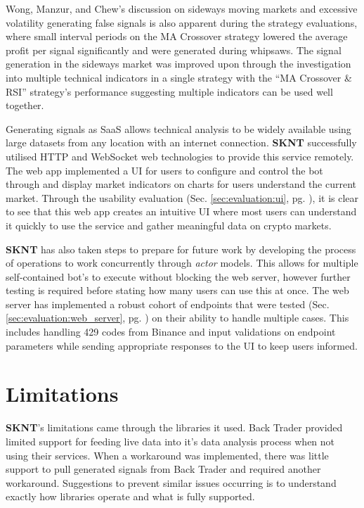 Wong, Manzur, and Chew's \cite{ART:Wong:2003} discussion on sideways moving markets and excessive volatility generating false signals is also apparent during the strategy evaluations, where small interval periods on the MA Crossover strategy lowered the average profit per signal significantly and were generated during whipsaws. The signal generation in the sideways market was improved upon through the investigation into multiple technical indicators in a single strategy with the ``MA Crossover \& RSI'' strategy's performance suggesting multiple indicators can be used well together.

\noindent Generating signals as SaaS allows technical analysis to be widely available using large datasets from any location with an internet connection. \textbf{SKNT} successfully utilised HTTP and WebSocket web technologies to provide this service remotely. The web app implemented a UI for users to configure and control the bot through and display market indicators on charts for users understand the current market. Through the usability evaluation (Sec. \ref{sec:evaluation:ui}, pg. \pageref{sec:evaluation:ui}), it is clear to see that this web app creates an intuitive UI where most users can understand it quickly to use the service and gather meaningful data on crypto markets.

\textbf{SKNT} has also taken steps to prepare for future work by developing the process of operations to work concurrently through \textit{actor} models. This allows for multiple self-contained bot's to execute without blocking the web server, however further testing is required before stating how many users can use this at once. The web server has implemented a robust cohort of endpoints that were tested (Sec. \ref{sec:evaluation:web_server}, pg. \pageref{sec:evaluation:web_server}) on their ability to handle multiple cases. This includes handling 429 codes from Binance and input validations on endpoint parameters while sending appropriate responses to the UI to keep users informed.

\section{Limitations}
\label{sec:conclusion:limitations}
\noindent \textbf{SKNT}'s limitations came through the libraries it used. Back Trader provided limited support for feeding live data into it's data analysis process when not using their services. When a workaround was implemented, there was little support to pull generated signals from Back Trader and required another workaround. Suggestions to prevent similar issues occurring is to understand exactly how libraries operate and what is fully supported.



